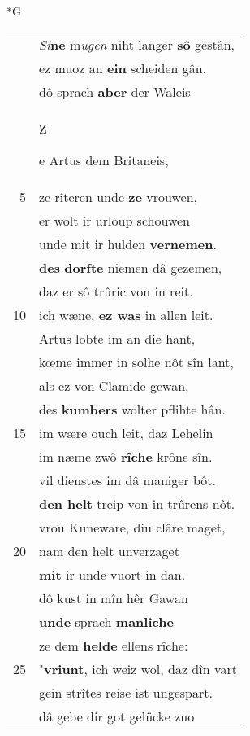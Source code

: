 \documentclass[8pt,a4paper,notitlepage]{article}
\begin{document}
\newpage
\begin{table}[ht]
\begin{minipage}[t]{0.5\linewidth}
\small
\begin{center}*G
\end{center}
\begin{tabular}{rl}
 & \textit{Si}\textbf{ne} m\textit{ugen} niht langer \textbf{sô} gestân,\\ 
 & ez muoz an \textbf{ein} scheiden gân.\\ 
 & dô sprach \textbf{aber} der Waleis\\ 
 & \begin{large}Z\end{large}e Artus dem Britaneis,\\ 
5 & ze rîteren unde \textbf{ze} vrouwen,\\ 
 & er wolt ir urloup schouwen\\ 
 & unde mit ir hulden \textbf{vernemen}.\\ 
 & \textbf{des} \textbf{dorfte} niemen dâ gezemen,\\ 
 & daz er sô trûric von in reit.\\ 
10 & ich wæne, \textbf{ez was} in allen leit.\\ 
 & Artus lobte im an die hant,\\ 
 & kœme immer in solhe nôt sîn lant,\\ 
 & als ez von Clamide gewan,\\ 
 & des \textbf{kumbers} wolter pflihte hân.\\ 
15 & im wære ouch leit, daz Lehelin\\ 
 & im næme zwô \textbf{rîche} krône sîn.\\ 
 & vil dienstes im dâ maniger bôt.\\ 
 & \textbf{den helt} treip von in trûrens nôt.\\ 
 & vrou Kuneware, diu clâre maget,\\ 
20 & nam den helt unverzaget\\ 
 & \textbf{mit} ir unde vuort in dan.\\ 
 & dô kust in mîn hêr Gawan\\ 
 & \textbf{unde} sprach \textbf{manlîche}\\ 
 & ze dem \textbf{helde} ellens rîche:\\ 
25 & "\textbf{vriunt}, ich weiz wol, daz dîn vart\\ 
 & gein strîtes reise ist ungespart.\\ 
 & dâ gebe dir got gelücke zuo\\ 

\end{tabular}
\end{minipage}
\end{table}
\end{document}
